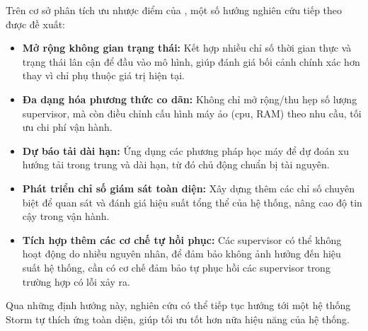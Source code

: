 Trên cơ sở phân tích ưu nhược điểm của \tenKL, một số hướng nghiên cứu tiếp theo được đề xuất:
\begin{itemize}
    \item \textbf{Mở rộng không gian trạng thái:} Kết hợp nhiều chỉ số thời gian thực và trạng thái lân cận để đầu vào mô hình, giúp đánh giá bối cảnh chính xác hơn thay vì chỉ phụ thuộc giá trị hiện tại.
    \item \textbf{Đa dạng hóa phương thức co dãn:} Không chỉ mở rộng/thu hẹp số lượng supervisor, mà còn điều chỉnh cấu hình máy ảo (\gls{cpu}, RAM) theo nhu cầu, tối ưu chi phí vận hành.
    \item \textbf{Dự báo tải dài hạn:} Ứng dụng các phương pháp học máy để dự đoán xu hướng tải trong trung và dài hạn, từ đó chủ động chuẩn bị tài nguyên.
    \item \textbf{Phát triển chỉ số giám sát toàn diện:} Xây dựng thêm các chỉ số chuyên biệt để quan sát và đánh giá hiệu suất tổng thể của hệ thống, nâng cao độ tin cậy trong vận hành.
    \item \textbf{Tích hợp thêm các cơ chế tự hồi phục:} Các supervisor có thể không hoạt động do nhiều nguyên nhân, để đảm bảo không ảnh hưởng đến hiệu suất hệ thống, cần có cơ chế đảm bảo tự phục hồi các supervisor trong trường hợp có lỗi xảy ra.
\end{itemize}

Qua những định hướng này, nghiên cứu có thể tiếp tục hướng tới một hệ thống Storm tự thích ứng toàn diện, giúp tối ưu tốt hơn nữa hiệu năng của hệ thống.
